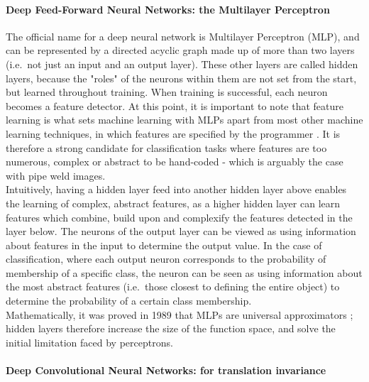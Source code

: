 \documentclass[a4paper,11pt]{article}
\begin{document}
\paragraph{Deep Feed-Forward Neural Networks: the Multilayer Perceptron}

The official name for a deep neural network is Multilayer Perceptron (MLP), and can be represented by a directed acyclic graph made up of more than two layers (i.e.\ not just an input and an output layer). These other layers are called hidden layers, because the "roles" of the neurons within them are not set from the start, but learned throughout training. When training is successful, each neuron becomes a feature detector. At this point, it is important to note that feature learning is what sets machine learning with MLPs apart from most other machine learning techniques, in which features are specified by the programmer \cite{DL-book}. It is therefore a strong candidate for classification tasks where features are too numerous, complex or abstract to be hand-coded - which is arguably the case with pipe weld images.\\ 

Intuitively, having a hidden layer feed into another hidden layer above enables the learning of complex, abstract features, as a higher hidden layer can learn features which combine, build upon and complexify the features detected in the layer below. The neurons of the output layer can be viewed as using information about features in the input to determine the output value. In the case of classification, where each output neuron corresponds to the probability of membership of a specific class, the neuron can be seen as using information about the most abstract features (i.e.\ those closest to defining the entire object) to determine the probability of a certain class membership. \\

Mathematically, it was proved in 1989 that MLPs are universal approximators \cite{MLP-univ-approx}; hidden layers therefore increase the size of the function space, and solve the initial limitation faced by perceptrons.\\


\paragraph{Deep Convolutional Neural Networks: for translation invariance}
\end{document}
